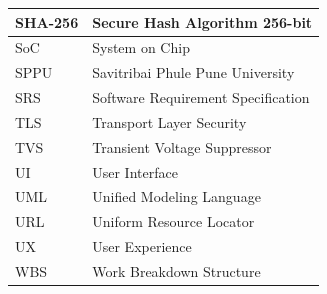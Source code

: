 \begin{center}
\begin{longtable}{|p{1.4in}|p{4.1in}|}
SHA-256 & Secure Hash Algorithm 256-bit\\ \hline
SoC & System on Chip\\ \hline
SPPU & Savitribai Phule Pune University\\ \hline
SRS & Software Requirement Specification\\ \hline
TLS & Transport Layer Security\\ \hline
TVS & Transient Voltage Suppressor\\ \hline
UI & User Interface\\ \hline
UML & Unified Modeling Language\\ \hline
URL & Uniform Resource Locator\\ \hline
UX & User Experience\\ \hline
WBS & Work Breakdown Structure\\
\hline

\end{longtable}
\end{center}

\clearpage
